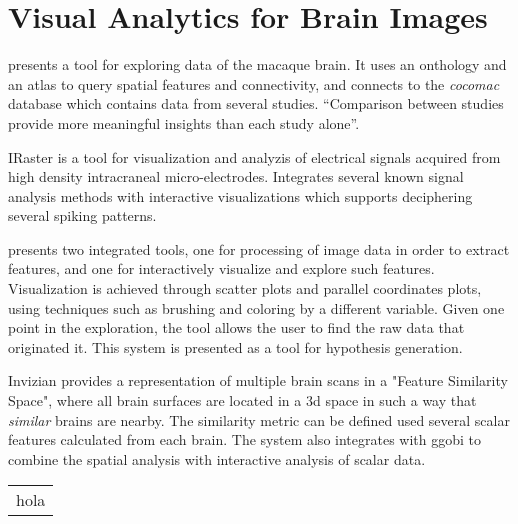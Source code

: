 \section{Visual Analytics for Brain Images}

\autocite{bezgin_matching_2009} presents a tool for exploring data of the macaque brain. It uses an onthology and an atlas to query spatial features and connectivity, and connects to the \emph{cocomac} database which contains data from several studies. ``Comparison between studies provide more meaningful insights than each study alone''.

IRaster \autocite{somerville_iraster:_2010}  is a tool for visualization and analyzis of electrical signals acquired from high density intracraneal micro-electrodes. Integrates several known signal analysis methods with interactive visualizations which supports deciphering several spiking patterns.

\autocite{steenwijk_integrated_2010} presents two integrated tools, one for processing of image data in order to extract features, and one for interactively visualize and explore such features. Visualization is achieved through scatter plots and parallel coordinates plots, using techniques such as brushing and coloring by a different variable.  Given one point in the exploration, the tool allows the user to find the raw data that originated it. This system is presented as a tool for hypothesis generation. 

Invizian \autocite{bowman_query-based_2011, bowman_visual_2012, van_horn_graphical_2013} provides a representation of multiple brain scans in a "Feature Similarity Space", where all brain surfaces are located in a 3d space in such a way that \emph{similar} brains are nearby. The similarity metric can be defined used several scalar features calculated from each brain. The system also integrates with ggobi to combine the spatial analysis with interactive analysis of scalar data.

\begin{table}
	\centering
		\begin{tabular}{c}
			hola
		\end{tabular}
	\label{tab_related_applications}
\end{table}